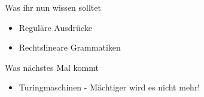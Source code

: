 \begin{frame}	
	\begin{block}{Was ihr nun wissen solltet}
		\begin{itemize}
			\item Reguläre Ausdrücke
			\item Rechtslineare Grammatiken
		\end{itemize}
	\end{block}
	
	\begin{block}{Was nächstes Mal kommt}
		\begin{itemize}
			\item Turingmaschinen - Mächtiger wird es nicht mehr!
		\end{itemize}
	\end{block}
\end{frame}


\slideThanks

